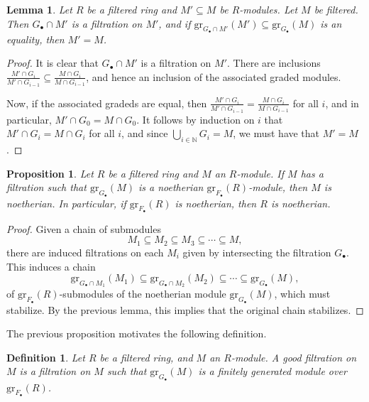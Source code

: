\documentclass[11pt]{book}
\newtheorem{lemma}[theorem]{Lemma}
\newtheorem{proposition}[theorem]{Proposition}
\newtheorem{definition}[theorem]{Definition}
\numberwithin{equation}{section}
\numberwithin{theorem}{chapter}
\theoremstyle{definition}
\newtheorem*{basic properties}{Basic Properties}
\newtheorem*{Important Remark}{Important Remark}
\theoremstyle{remark}
\newcommand{\NN}{\mathbb{N}}
\begin{document}
\begin{lemma}
	Let $R$ be a filtered ring and $M'\subseteq M$ be $R$-modules. Let $M$ be filtered. Then $G_{\bullet} \cap M'$ is a filtration on $M'$, and if $\mathrm{gr}_{G_\bullet \cap M'}(M')\subseteq \mathrm{gr}_{G_\bullet}(M)$ is an equality, then $M'=M$.
\end{lemma}
\begin{proof}
	It is clear that $G_{\bullet} \cap M'$ is a filtration on $M'$. There are inclusions $\frac{M'\cap G_i}{M' \cap G_{i-1}}\subseteq \frac{M \cap G_i}{M \cap G_{i-1}}$, and hence an inclusion of the associated graded modules. 
	
	Now, if the associated gradeds are equal, then $\frac{M' \cap G_i}{M' \cap G_{i-1}}=\frac{M \cap G_i}{M \cap G_{i-1}}$ for all $i$, and in particular, $M' \cap G_0 = M \cap G_0$. It follows by induction on $i$ that $M' \cap G_i = M \cap G_i$ for all $i$, and since $\bigcup_{i\in \NN} G_i = M$, we must have that $M' = M$.
\end{proof}

\begin{proposition}
	Let $R$ be a filtered ring and $M$ an $R$-module. If $M$ has a filtration such that $\mathrm{gr}_{G_\bullet}(M)$ is a noetherian $\mathrm{gr}_{F_\bullet}(R)$-module, then $M$ is noetherian. In particular, if $\mathrm{gr}_{F_\bullet}(R)$ is noetherian, then $R$ is noetherian.
\end{proposition}
\begin{proof}
	Given a chain of submodules \[M_1 \subseteq M_2 \subseteq M_3 \subseteq \cdots \subseteq M,\]
	 there are induced filtrations on each $M_i$ given by intersecting the filtration $G_\bullet$. This induces a chain
	  \[\mathrm{gr}_{G_\bullet \cap M_1}(M_1) \subseteq \mathrm{gr}_{G_\bullet \cap M_2}(M_2) \subseteq  \cdots \subseteq \mathrm{gr}_{G_\bullet}(M),\]
	  of $\mathrm{gr}_{F_\bullet}(R)$-submodules of the noetherian module $\mathrm{gr}_{G_\bullet}(M)$, which must stabilize. By the previous lemma, this implies that the original chain stabilizes.
\end{proof}

The previous proposition motivates the following definition.

\begin{definition} Let $R$ be a filtered ring, and $M$ an $R$-module. A \emph{good filtration} on $M$ is a filtration on $M$ such that $\mathrm{gr}_{G_\bullet}(M)$ is a finitely generated module over $\mathrm{gr}_{F_\bullet}(R)$.
\end{definition}
\end{document}
